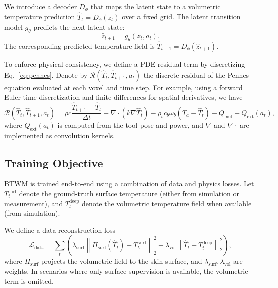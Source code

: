 \documentclass{article}
\begin{document}
We introduce a decoder $D_{\phi}$ that maps the latent state to a volumetric temperature prediction $\hat{T}_t = D_{\phi}(z_t)$ over a fixed grid. The latent transition model $g_{\theta}$ predicts the next latent state:
\begin{equation}
    \hat{z}_{t+1} = g_{\theta}(z_t, a_t).
\end{equation}
The corresponding predicted temperature field is $\hat{T}_{t+1} = D_{\phi}(\hat{z}_{t+1})$.

To enforce physical consistency, we define a PDE residual term by discretizing Eq.~\eqref{eq:pennes}. Denote by $\mathcal{R}(\hat{T}_t, \hat{T}_{t+1}, a_t)$ the discrete residual of the Pennes equation evaluated at each voxel and time step. For example, using a forward Euler time discretization and finite differences for spatial derivatives, we have
\begin{equation}
\mathcal{R}(\hat{T}_t, \hat{T}_{t+1}, a_t)
=
\rho c \frac{\hat{T}_{t+1} - \hat{T}_t}{\Delta t}
-
\nabla \cdot (k \nabla \hat{T}_t)
-
\rho_b c_b \omega_b (T_a - \hat{T}_t)
-
Q_{\mathrm{met}}
-
Q_{\mathrm{ext}}(a_t),
\end{equation}
where $Q_{\mathrm{ext}}(a_t)$ is computed from the tool pose and power, and $\nabla$ and $\nabla \cdot$ are implemented as convolution kernels.

\subsection{Training Objective}
\label{sec:objective}

BTWM is trained end-to-end using a combination of data and physics losses. Let $T_t^{\mathrm{surf}}$ denote the ground-truth surface temperature (either from simulation or measurement), and $T_t^{\mathrm{deep}}$ denote the volumetric temperature field when available (from simulation).

We define a data reconstruction loss
\begin{equation}
\mathcal{L}_{\mathrm{data}}
=
\sum_t
\left(
\lambda_{\mathrm{surf}}
\left\|
\Pi_{\mathrm{surf}}(\hat{T}_t) - T_t^{\mathrm{surf}}
\right\|_2^2
+
\lambda_{\mathrm{vol}}
\left\|
\hat{T}_t - T_t^{\mathrm{deep}}
\right\|_2^2
\right),
\end{equation}
where $\Pi_{\mathrm{surf}}$ projects the volumetric field to the skin surface, and $\lambda_{\mathrm{surf}}, \lambda_{\mathrm{vol}}$ are weights. In scenarios where only surface supervision is available, the volumetric term is omitted.
\end{document}
